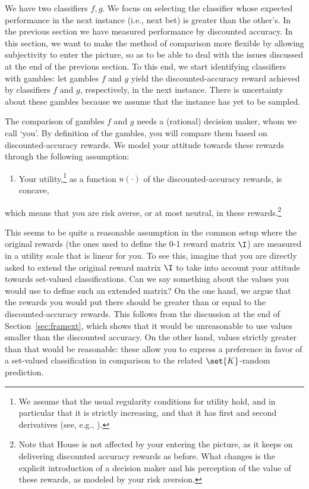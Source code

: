 \documentclass[a4paper,10pt,reqno]{amsart}
\theoremstyle{remark}
\begin{document}
We have two classifiers $f,g$. We focus on selecting the classifier whose expected performance in the next instance (i.e., next bet) is greater than the other's. In the previous section we have measured performance by discounted accuracy. In this section, we want to make the method of comparison more flexible by allowing subjectivity to enter the picture, so as to be able to deal with the issues discussed at the end of the previous section. To this end, we start identifying classifiers with gambles: let gambles $f$ and $g$ yield the discounted-accuracy reward achieved by classifiers $f$ and $g$, respectively, in the next instance. There is uncertainty about these gambles because we assume that the instance has yet to be sampled.

The comparison of gambles $f$ and $g$ needs a (rational) decision maker, whom we call `you'. By definition of the gambles, you will compare them based on discounted-accuracy rewards. We model your attitude towards these rewards through the following assumption:
\begin{enumerate}[font=\normalfont,label=(A6)]
\item\label{hp:A6} Your utility,\footnote{We assume that the usual regularity conditions for utility hold, and in particular that it is strictly increasing, and that it has first and second derivatives (see, e.g., \cite{luenberger1998}).} as a function $u(\cdot)$ of the discounted-accuracy rewards, is concave,
\end{enumerate}
which means that you are risk averse, or at most neutral, in these rewards.\footnote{Note that House is not affected by your entering the picture, as it keeps on delivering discounted accuracy rewards as before. What changes is the explicit introduction of a decision maker and his perception of the value of these rewards, as modeled by your risk aversion.}

This seems to be quite a reasonable assumption in the common setup where the original rewards (the ones used to define the 0-1 reward matrix $\I$) are measured in a utility scale that is linear for you. To see this, imagine that you are directly asked to extend the original reward matrix $\I$ to take into account your attitude towards set-valued classifications. Can we say something about the values you would use to define such an extended matrix? On the one hand, we argue that the rewards you would put there should be greater than or equal to the discounted-accuracy rewards. This follows from the discussion at the end of Section~\ref{sec:framext}, which shows that it would be unreasonable to use values smaller than the discounted accuracy. On the other hand, values strictly greater than that would be reasonable: these allow you to express a preference in favor of a set-valued classification in comparison to the related $\set{K}$-random prediction. 
\end{document}
